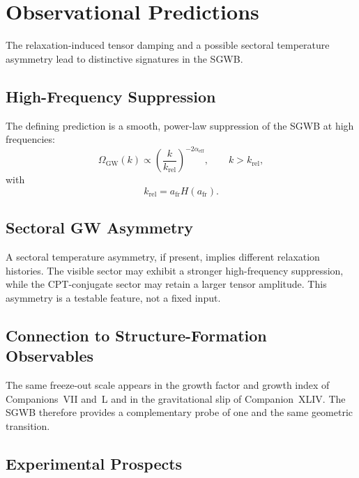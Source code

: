 \documentclass[11pt,a4paper]{article}
\begin{document}
\section{Observational Predictions}

The relaxation-induced tensor damping and a possible sectoral temperature
asymmetry lead to distinctive signatures in the SGWB.

\subsection{High-Frequency Suppression}

The defining prediction is a smooth, power-law suppression of the SGWB at
high frequencies:
\begin{equation}
  \Omega_{\mathrm{GW}}(k)
  \propto
  \left(
    \frac{k}{k_{\mathrm{rel}}}
  \right)^{-2\alpha_{\mathrm{eff}}},
  \qquad
  k > k_{\mathrm{rel}},
\end{equation}
with
\begin{equation}
  k_{\mathrm{rel}}
  =
  a_{\mathrm{fr}} H(a_{\mathrm{fr}}).
\end{equation}

\subsection{Sectoral GW Asymmetry}

A sectoral temperature asymmetry, if present, implies different
relaxation histories. The visible sector may exhibit a stronger
high-frequency suppression, while the CPT-conjugate sector may retain a
larger tensor amplitude. This asymmetry is a testable feature, not a
fixed input.

\subsection{Connection to Structure-Formation Observables}

The same freeze-out scale appears in the growth factor and growth index
of Companions~VII and~L and in the gravitational slip of Companion~XLIV.
The SGWB therefore provides a complementary probe of one and the same
geometric transition.

\subsection{Experimental Prospects}
\end{document}
